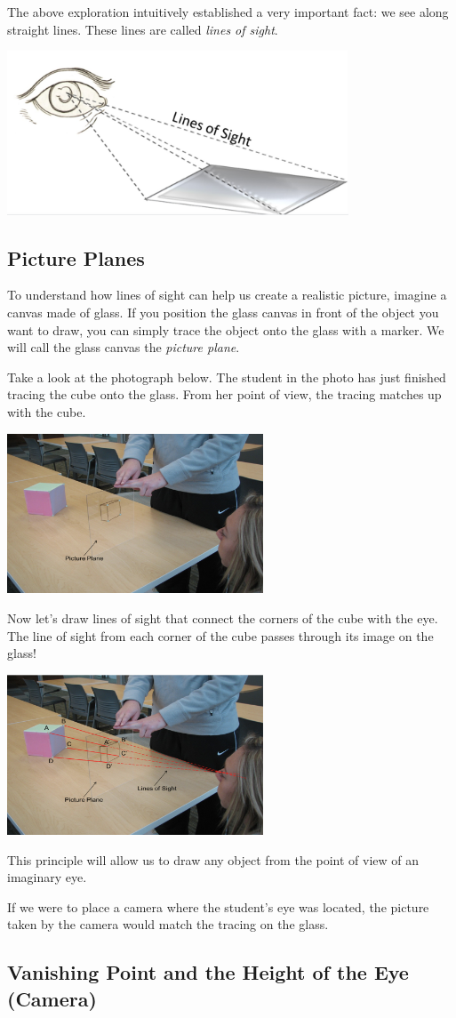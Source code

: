 \documentclass{ximera}
\begin{document}
The above exploration intuitively established a very important fact: we see along straight lines.  These lines are called \emph{lines of sight}.
\begin{image}
         \includegraphics[width=4in]{linesOfSight.jpg}
\end{image}

\subsection*{Picture Planes}
To understand how lines of sight can help us create a realistic picture, imagine a canvas made of glass.  If you position the glass canvas in front of the object you want to draw, you can simply trace the object onto the glass with a marker.  We will call the glass canvas the \emph{picture plane}.

Take a look at the photograph below.  The student in the photo has just finished tracing the cube onto the glass.  From her point of view, the tracing matches up with the cube. 

\begin{image}
         \includegraphics[width=3in]{cube.jpg}
\end{image}

Now let’s draw lines of sight that connect the corners of the cube with the eye. The line of sight from each corner of the cube passes through its image on the glass!  

\begin{image}
         \includegraphics[width=3in]{cubeLines.jpg}
\end{image}

This principle will allow us to draw any object from the point of view of an imaginary eye.

If we were to place a camera where the student's eye was located, the picture taken by the camera would match the tracing on the glass.

\subsection*{Vanishing Point and the Height of the Eye (Camera)}
\end{document}
